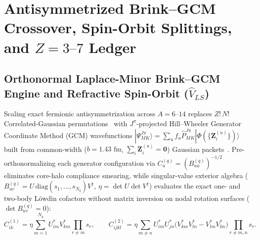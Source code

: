 \documentclass[11pt, a4paper]{article}
\begin{document}
\section{\texorpdfstring{Antisymmetrized Brink--GCM Crossover, Spin-Orbit Splittings, and $Z = 3\text{--}7$ Ledger}{Antisymmetrized Brink-GCM Crossover, Spin-Orbit Splittings, and Z = 3--7 Ledger}}
\label{sec:manybody_architectures}

\subsection{\texorpdfstring{Orthonormal Laplace-Minor Brink--GCM Engine and Refractive Spin-Orbit ($\hat{V}_{LS}$)}{Orthonormal Laplace-Minor Brink-GCM Engine and Refractive Spin-Orbit}}
Scaling exact fermionic antisymmetrization across $A = 6\text{--}14$ replaces $Z!\,N!$ Correlated-Gaussian permutations~\cite{suzuki1998} with $J^\pi$-projected Hill--Wheeler Generator Coordinate Method (GCM) wavefunctions $|\Psi^{J\pi}_{MK}\rangle = \sum_u f_u \hat{P}^{J\pi}_{MK}|\Phi(\{\mathbf{Z}_i^{(u)}\})\rangle$ built from common-width ($b = 1.43\text{ fm}$, $\sum_i \mathbf{Z}_i^{(u)} = \mathbf{0}$) Gaussian packets~\cite{wildermuth1977}. Pre-orthonormalizing each generator configuration via $C_u^{(q)} = (B_{uu}^{(q)})^{-1/2}$ eliminates core-halo compliance smearing, while singular-value exterior algebra ($B_{uv}^{(q)} = U\,\mathrm{diag}(s_1,\dots,s_{N_q})V^\dagger$, $\eta = \det U\det V^\dagger$) evaluates the exact one- and two-body L\"{o}wdin cofactors without matrix inversion on nodal rotation surfaces ($\det B_{uv}^{(q)} = 0$):
\begin{equation}
    C^{(1)}_{ik} = \eta\sum_{m=1}^{N_q} U^*_{im}V^*_{km}\!\!\prod_{r\neq m}\! s_r, \qquad
    C^{(2)}_{ijkl} = \eta\sum_{m\neq n} U^*_{im}U^*_{jn}\big(V^*_{km}V^*_{ln} - V^*_{lm}V^*_{kn}\big)\!\!\prod_{r\neq m,n}\!\! s_r.
    \label{eq:svd_exterior_minors}
\end{equation}
\end{document}
